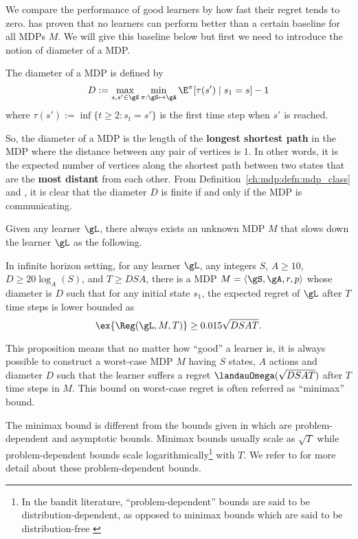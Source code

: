 We compare the performance of good learners by how fast their regret tends to zero.
\cite{jaksch2010near} has proven that no learners can perform better than a certain baseline for all MDPs $M$.
We will give this baseline below but first we need to introduce the notion of diameter of a MDP.
\begin{defn}
    The diameter of a MDP is defined by
    \begin{equation}
        \label{eq:diameter}
        D := \max_{s,s'\in\gS}\min_{\pi:\gS\mapsto\gA} \E^\pi[\tau(s') \mid s_1=s] -1
    \end{equation}
    where $\tau(s'):=\inf\{t\ge2 : s_t=s'\}$ is the first time step when $s'$ is reached.
    \label{ch:rl:defn:diameter}
\end{defn}
So, the diameter of a MDP is the length of the \textbf{longest shortest path} in the MDP where the distance between any pair of vertices is $1$.
In other words, it is the expected number of vertices along the shortest path between two states that are the \textbf{most distant} from each other.
From Definition~\ref{ch:mdp:defn:mdp_class} and \cite[Proposition~8.3.1]{puterman2014markov}, it is clear that the diameter $D$ is finite if and only if the MDP is communicating.

Given any learner $\gL$, there always exists an unknown MDP $M$ that slows down the learner $\gL$ as the following.
\begin{prop}
    \label{prop:minimax_rg_lb}
    In infinite horizon setting, for any learner $\gL$, any integers $S$, $A\ge10$, $D\ge 20\log_{A}(S)$, and $T\ge DSA$, there is a MDP $M=\langle\gS,\gA,r,p\rangle$ whose diameter is $D$ such that for any initial state $s_1$, the expected regret of $\gL$ after $T$ time steps is lower bounded as
    \begin{equation}
        \label{eq:minimax_rg_lb}
        \ex{\Reg(\gL, M, T)} \ge 0.015\sqrt{DSAT}.
    \end{equation}
\end{prop}
This proposition means that no matter how ``good'' a learner is, it is always possible to construct a worst-case MDP $M$ having $S$ states, $A$ actions and diameter $D$ such that the learner suffers a regret $\landauOmega(\sqrt{DSAT})$ after $T$ time steps in $M$.
This bound on worst-case regret is often referred as ``minimax'' bound.

The minimax bound is different from the bounds given in \cite{ok2018exploration, burnetas1997optimal} which are problem-dependent and asymptotic bounds.
Minimax bounds usually scale as $\sqrt{T}$ while problem-dependent bounds scale logarithmically\footnote{In the bandit literature, “problem-dependent” bounds are said to be distribution-dependent, as opposed to minimax bounds which are said to be distribution-free \cite{garivier2019explore}} with $T$.
We refer to \cite{ok2018exploration, burnetas1997optimal} for more detail about these problem-dependent bounds.

